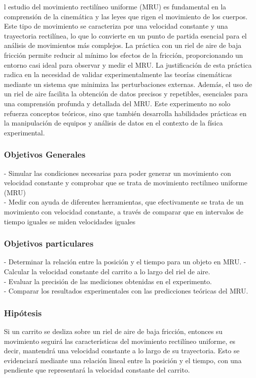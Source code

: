 \documentclass[journal]{IEEEtran}
\begin{document}
l estudio del movimiento rectilíneo uniforme (MRU) es fundamental en la comprensión de la cinemática y las leyes que rigen el movimiento de los cuerpos. Este tipo de movimiento se caracteriza por una velocidad constante y una trayectoria rectilínea, lo que lo convierte en un punto de partida esencial para el análisis de movimientos más complejos. La práctica con un riel de aire de baja fricción permite reducir al mínimo los efectos de la fricción, proporcionando un entorno casi ideal para observar y medir el MRU. La justificación de esta práctica radica en la necesidad de validar experimentalmente las teorías cinemáticas mediante un sistema que minimiza las perturbaciones externas. Además, el uso de un riel de aire facilita la obtención de datos precisos y repetibles, esenciales para una comprensión profunda y detallada del MRU. Este experimento no solo refuerza conceptos teóricos, sino que también desarrolla habilidades prácticas en la manipulación de equipos y análisis de datos en el contexto de la física experimental.\\

\subsubsection{Objetivos Generales}

 - Simular las condiciones necesarias para poder generar un movimiento con velocidad constante
 y comprobar que se trata de movimiento rectilıneo uniforme (MRU)\\
 - Medir con ayuda de diferentes herramientas, que efectivamente se trata de un movimiento con velocidad constante, a través de comparar que en intervalos de tiempo iguales se miden velocidades iguales\\

\subsubsection{Objetivos particulares}
- Determinar la relación entre la posición y el tiempo para un objeto en MRU.
- Calcular la velocidad constante del carrito a lo largo del riel de aire.\\
- Evaluar la precisión de las mediciones obtenidas en el experimento.\\
- Comparar los resultados experimentales con las predicciones teóricas del MRU.\\


\subsubsection{Hipótesis}
Si un carrito se desliza sobre un riel de aire de baja fricción, entonces su movimiento seguirá las características del movimiento rectilíneo uniforme, es decir, mantendrá una velocidad constante a lo largo de su trayectoria. Esto se evidenciará mediante una relación lineal entre la posición y el tiempo, con una pendiente que representará la velocidad constante del carrito.
\end{document}
